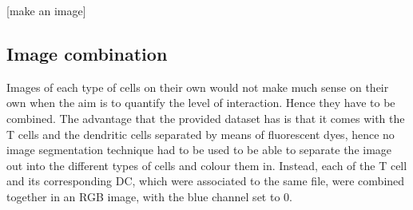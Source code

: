 [make an image]

\subsection{Image combination}

Images of each type of cells on their own would not make much sense on their own when the aim is to quantify the level of interaction. Hence they have to be combined. The advantage that the provided dataset has is that it comes with the T cells and the dendritic cells separated by means of fluorescent dyes, hence no image segmentation technique had to be used to be able to separate the image out into the different types of cells and colour them in. Instead, each of the T cell and its corresponding DC, which were associated to the same file, were combined together in an RGB image, with the blue channel set to 0. %


